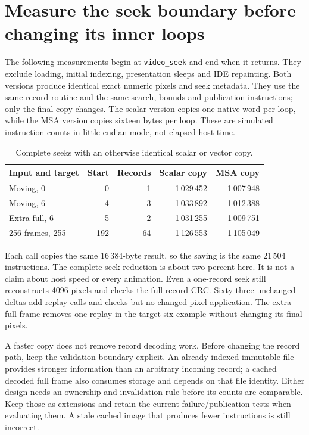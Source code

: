 \section{Measure the seek boundary before changing its inner loops}
The following measurements begin at \texttt{video\_seek} and end when it returns.
They exclude loading, initial indexing, presentation sleeps and IDE repainting.
Both versions produce identical exact numeric pixels and seek metadata. They use
the same record routine and the same search, bounds and publication instructions;
only the final copy changes. The scalar version copies one native word per loop,
while the MSA version copies sixteen bytes per loop. These are simulated
instruction counts in little-endian mode, not elapsed host time.

\begin{table}[htbp]
\centering
\caption{Complete seeks with an otherwise identical scalar or vector copy.}
\label{tab:video-seek-work}
\begin{tabular}{l r r r r}
\toprule
Input and target & Start & Records & Scalar copy & MSA copy \\
\midrule
Moving, 0 & 0 & 1 & 1\,029\,452 & 1\,007\,948 \\
Moving, 6 & 4 & 3 & 1\,033\,892 & 1\,012\,388 \\
Extra full, 6 & 5 & 2 & 1\,031\,255 & 1\,009\,751 \\
256 frames, 255 & 192 & 64 & 1\,126\,553 & 1\,105\,049 \\
\bottomrule
\end{tabular}
\end{table}

Each call copies the same 16\,384-byte result, so the saving is the same
21\,504 instructions. The complete-seek reduction is about two percent here.
It is not a claim about host speed or every animation. Even a one-record seek
still reconstructs 4096 pixels and checks the full record CRC. Sixty-three
unchanged deltas add replay calls and checks but no changed-pixel application.
The extra full frame removes one replay in the target-six example without
changing its final pixels.

A faster copy does not remove record decoding work. Before changing the record
path, keep the validation boundary explicit. An already indexed immutable file
provides stronger information than an arbitrary incoming record; a cached decoded
full frame also consumes storage and depends on that file identity. Either design
needs an ownership and invalidation rule before its counts are comparable. Keep
those as extensions and retain the current failure/publication tests when evaluating
them. A stale cached image that produces fewer instructions is still incorrect.

